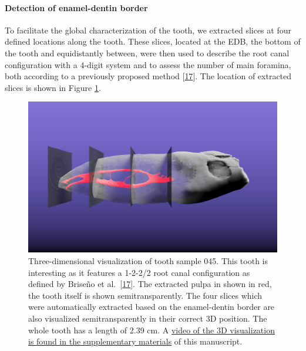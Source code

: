 \documentclass[
  american,
]{article}
\begin{document}
\hypertarget{detection-of-enamel-dentin-border}{%
\paragraph{Detection of enamel-dentin border}\label{detection-of-enamel-dentin-border}}

To facilitate the global characterization of the tooth, we extracted slices at four defined locations along the tooth.
These slices, located at the EDB, the bottom of the tooth and equidistantly between, were then used to describe the root canal configuration with a 4-digit system and to assess the number of main foramina, both according to a previously proposed method {[}\protect\hyperlink{ref-ZTgDEakx}{17}{]}.
The location of extracted slices is shown in Figure \ref{fig:3dmevislab}.

\begin{figure}
\hypertarget{fig:3dmevislab}{%
\centering
\includegraphics{images/Tooth045.MeVisLab.png}
\caption{Three-dimensional visualization of tooth sample 045.
This tooth is interesting as it features a 1-2-2/2 root canal configuration as defined by Briseño et al.~{[}\protect\hyperlink{ref-ZTgDEakx}{17}{]}.
The extracted pulpa in shown in red, the tooth itself is shown semitransparently.
The four slices which were automatically extracted based on the enamel-dentin border are also visualized semitransparently in their correct 3D position.
The whole tooth has a length of 2.39 cm.
A \href{https://github.com/habi/zmk-tooth-cohort-method-manuscript/blob/master/content/images/tooth045.mp4?raw=true}{video of the 3D visualization is found in the supplementary materials} of this manuscript.}\label{fig:3dmevislab}
}
\end{figure}
\end{document}
